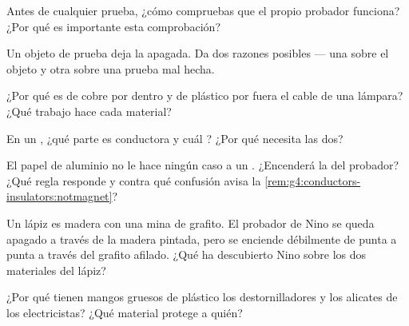 \begin{exercise}[$\star$]\label{exo:g4:conductors-insulators:3}
Antes de cualquier prueba, ¿cómo compruebas que el propio probador
funciona? ¿Por qué es importante esta comprobación?
\end{exercise}

\begin{exercise}[$\star$]\label{exo:g4:conductors-insulators:4}
Un objeto de prueba deja la  apagada. Da dos razones
posibles --- una sobre el objeto y otra sobre una prueba mal hecha.
\end{exercise}

\begin{exercise}[$\star$]\label{exo:g4:conductors-insulators:5}
¿Por qué es de cobre por dentro y de plástico por fuera el cable de
una lámpara? ¿Qué trabajo hace cada material?
\end{exercise}

\begin{exercise}[$\star$]\label{exo:g4:conductors-insulators:6}
En un , ¿qué parte es conductora y cuál ? ¿Por
qué necesita las dos?
\end{exercise}

\begin{exercise}[$\star$]\label{exo:g4:conductors-insulators:7}
El papel de aluminio no le hace ningún caso a un .
¿Encenderá la  del probador? ¿Qué regla responde y contra
qué confusión avisa la \cref{rem:g4:conductors-insulators:notmagnet}?
\end{exercise}

\begin{exercise}[$\star$]\label{exo:g4:conductors-insulators:8}
Un lápiz es madera con una mina de grafito. El probador de Nino se
queda apagado a través de la madera pintada, pero se enciende
débilmente de punta a punta a través del grafito afilado. ¿Qué ha
descubierto Nino sobre los dos materiales del lápiz?
\end{exercise}

\begin{exercise}[$\star$]\label{exo:g4:conductors-insulators:9}
¿Por qué tienen mangos gruesos de plástico los destornilladores y los
alicates de los electricistas? ¿Qué material protege a quién?
\end{exercise}

